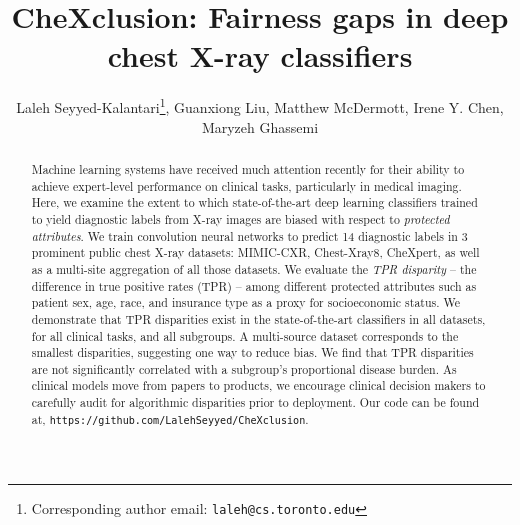 \documentclass{ws-procs11x85}
\begin{document}
\title{CheXclusion: Fairness gaps in deep chest X-ray classifiers}

\author{Laleh Seyyed-Kalantari\footnote{Corresponding author email: \texttt{laleh@cs.toronto.edu}}, Guanxiong Liu, Matthew McDermott, Irene Y. Chen, Maryzeh Ghassemi}

\address{Computer Science, University of Toronto, Toronto, Ontario, Canada}

\address{Vector Institute, Toronto, Ontario, Canada}

\address{Electrical Engineering and Computer Science, Massachusetts Institute of Technology,\\
Cambridge, MA USA}



\begin{abstract}
Machine learning systems have received much attention recently for their ability to achieve expert-level performance on clinical tasks, particularly in medical imaging. 
Here, we examine the extent to which state-of-the-art deep learning classifiers trained to yield diagnostic labels from X-ray images are biased with respect to \textit{protected attributes}.
We train convolution neural networks to predict 14 diagnostic labels in 3 prominent public chest X-ray datasets: MIMIC-CXR, Chest-Xray8, CheXpert, as well as a multi-site aggregation of all those datasets. We evaluate the \textit{TPR disparity} -- the difference in true positive rates (TPR) -- among different protected attributes such as patient sex, age, race, and insurance type as a proxy for socioeconomic status. 
We demonstrate that TPR disparities exist in the state-of-the-art classifiers in all datasets, for all clinical tasks, and all subgroups. A multi-source dataset corresponds to the smallest disparities, suggesting one way to reduce bias.
We find that TPR disparities are not significantly correlated with a subgroup's proportional disease burden.  As clinical models move from papers to products, we encourage clinical decision makers to carefully audit for algorithmic disparities prior to deployment. Our code can be found at,  \texttt{https://github.com/LalehSeyyed/CheXclusion}.
\end{abstract}


\end{document}
